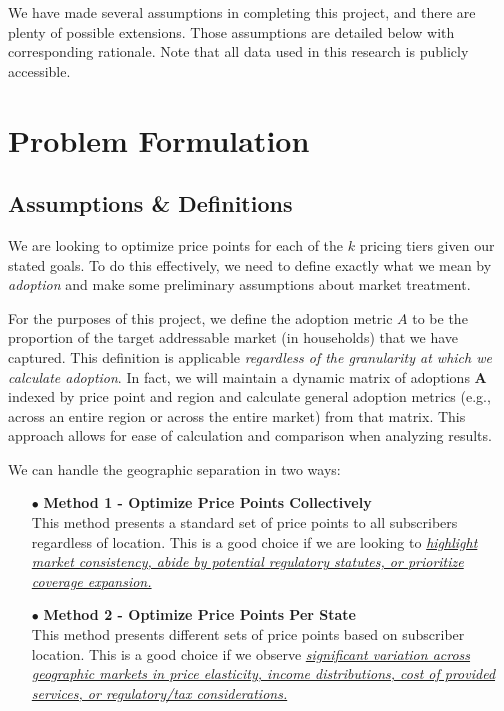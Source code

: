 \documentclass[11pt, titlepage]{report}
\begin{document}
We have made several assumptions in completing this project, and there are plenty of possible extensions. Those assumptions are detailed below with corresponding rationale. Note that all data used in this research is publicly accessible.

\section*{Problem Formulation}
\subsection*{Assumptions \& Definitions}
We are looking to optimize price points for each of the $k$ pricing tiers given our stated goals. To do this effectively, we need to define exactly what we mean by \textit{adoption} and make some preliminary assumptions about market treatment. \par

For the purposes of this project, we define the adoption metric $A$ to be the proportion of the target addressable market (in households) that we have captured. This definition is applicable \textit{regardless of the granularity at which we calculate adoption}. In fact, we will maintain a dynamic matrix of adoptions $\mathbf{A}$ indexed by price point and region and calculate general adoption metrics (e.g., across an entire region or across the entire market) from that matrix. This approach allows for ease of calculation and comparison when analyzing results. \par

We can handle the geographic separation in two ways:
\begin{itemize}[topsep=0pt, after=\vspace{5pt}]
  \item [$\bullet$] \textbf{Method 1 - Optimize Price Points Collectively} \\[0.1em]
  This method presents a standard set of price points to all subscribers regardless of location. This is a good choice if we are looking to \ul{\textit{highlight market consistency, abide by potential regulatory statutes, or prioritize coverage expansion.}}

  \item [$\bullet$] \textbf{Method 2 - Optimize Price Points Per State} \\[0.1em]
  This method presents different sets of price points based on subscriber location. This is a good choice if we observe \ul{\textit{significant variation across geographic markets in price elasticity, income distributions, cost of provided services, or regulatory/tax considerations.}}
\end{itemize}
\end{document}
